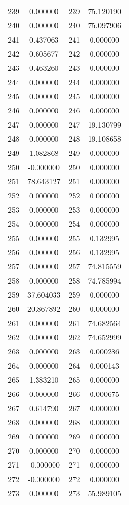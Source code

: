 \documentclass[12pt]{article}
\begin{document}
\begin{longtable}{@{}cccc@{}}
239 & 0.000000 & 239 & 75.120190 \\
240 & 0.000000 & 240 & 75.097906 \\
241 & 0.437063 & 241 & 0.000000 \\
242 & 0.605677 & 242 & 0.000000 \\
243 & 0.463260 & 243 & 0.000000 \\
244 & 0.000000 & 244 & 0.000000 \\
245 & 0.000000 & 245 & 0.000000 \\
246 & 0.000000 & 246 & 0.000000 \\
247 & 0.000000 & 247 & 19.130799 \\
248 & 0.000000 & 248 & 19.108658 \\
249 & 1.082868 & 249 & 0.000000 \\
250 & -0.000000 & 250 & 0.000000 \\
251 & 78.643127 & 251 & 0.000000 \\
252 & 0.000000 & 252 & 0.000000 \\
253 & 0.000000 & 253 & 0.000000 \\
254 & 0.000000 & 254 & 0.000000 \\
255 & 0.000000 & 255 & 0.132995 \\
256 & 0.000000 & 256 & 0.132995 \\
257 & 0.000000 & 257 & 74.815559 \\
258 & 0.000000 & 258 & 74.785994 \\
259 & 37.604033 & 259 & 0.000000 \\
260 & 20.867892 & 260 & 0.000000 \\
261 & 0.000000 & 261 & 74.682564 \\
262 & 0.000000 & 262 & 74.652999 \\
263 & 0.000000 & 263 & 0.000286 \\
264 & 0.000000 & 264 & 0.000143 \\
265 & 1.383210 & 265 & 0.000000 \\
266 & 0.000000 & 266 & 0.000675 \\
267 & 0.614790 & 267 & 0.000000 \\
268 & 0.000000 & 268 & 0.000000 \\
269 & 0.000000 & 269 & 0.000000 \\
270 & 0.000000 & 270 & 0.000000 \\
271 & -0.000000 & 271 & 0.000000 \\
272 & -0.000000 & 272 & 0.000000 \\
273 & 0.000000 & 273 & 55.989105 \\

\end{longtable}
\end{document}
